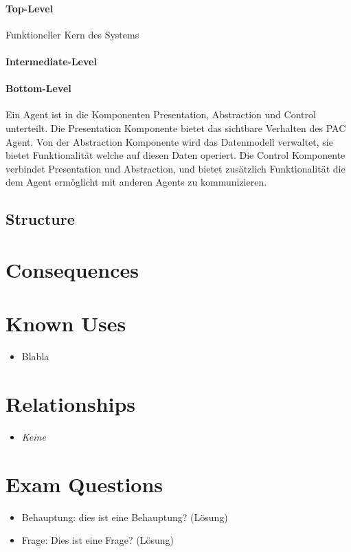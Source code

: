 \paragraph{Top-Level} Funktioneller Kern des Systems
\paragraph{Intermediate-Level}
\paragraph{Bottom-Level}
Ein Agent ist in die Komponenten Presentation, Abstraction und Control unterteilt. Die Presentation Komponente bietet das sichtbare Verhalten des PAC Agent. Von der Abstraction Komponente wird das Datenmodell verwaltet, sie bietet Funktionalität welche auf diesen Daten operiert. Die Control Komponente verbindet Presentation und Abstraction, und bietet zusätzlich Funktionalität die dem Agent ermöglicht mit anderen Agents zu kommunizieren.


\subsection{Structure}

\section{Consequences}
\begin{itemize}
\end{itemize}

\section{Known Uses}
\begin{itemize}
	\item Blabla
\end{itemize}

\section{Relationships}
\begin{itemize}
	\item \textit{Keine} 
\end{itemize}

\section{Exam Questions}
\begin{itemize}
  \item Behauptung: dies ist eine Behauptung? (Lösung)
    \item Frage: Dies ist eine Frage? (Lösung)
\end{itemize}
